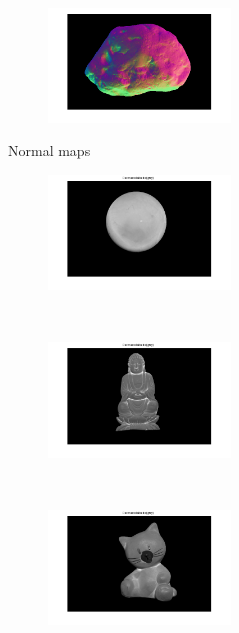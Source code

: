 \documentclass{paper}
\begin{document}
\begin{figure}[h!]
\begin{subfigure}[]{0.33\textwidth}
    \end{subfigure}%
    ~ 
    \begin{subfigure}[]{0.33\textwidth}
        \centering
        \includegraphics[height=1.2in]{rockNM}
    \end{subfigure}

    \caption{Normal maps}    
\end{figure}

\begin{figure}[h!]
    \centering
    \begin{subfigure}[]{0.33\textwidth}
        \centering
        \includegraphics[height=1.2in]{sphereGA}
    \end{subfigure}%
    ~ 
    \begin{subfigure}[]{0.33\textwidth}
        \centering
        \includegraphics[height=1.2in]{buddhaGA}
    \end{subfigure}%
    ~ 
    \begin{subfigure}[]{0.33\textwidth}
        \centering
        \includegraphics[height=1.2in]{catGA}
    \end{subfigure}
        \begin{subfigure}[]{0.33\textwidth}

\end{subfigure}
\end{figure}
\end{document}
